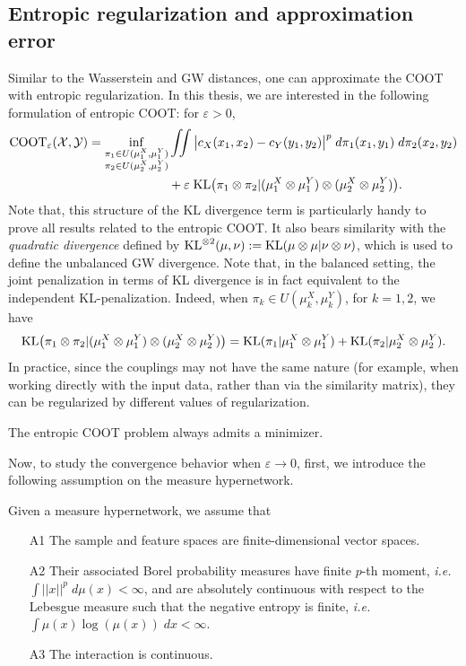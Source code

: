 \subsection{Entropic regularization and approximation error}
Similar to the Wasserstein and GW distances, one can approximate the COOT with entropic regularization.
In this thesis, we are interested in the following formulation of entropic COOT:
for $\varepsilon > 0$,
\begin{align}
  \text{COOT}_{\varepsilon} (\mathcal X, \mathcal Y) =
  \inf_{\substack{\pi_1 \in U(\mu^X_1, \mu^Y_1) \\
  \pi_2 \in U(\mu^X_2, \mu^Y_2)}} &\iint
  \big\vert c_X(x_1, x_2) - c_Y(y_1, y_2) \big\vert^p \; d\pi_1(x_1, y_1) \; d\pi_2(x_2, y_2) \\
  &+ \varepsilon \; \text{KL} \big( \pi_1 \otimes \pi_2 \vert (\mu^X_1 \otimes \mu^Y_1) \otimes (\mu^X_2 \otimes \mu^Y_2) \big).
\end{align}
Note that, this structure of the KL divergence term is particularly handy to prove all results related to
the entropic COOT. It also bears similarity with the \textit{quadratic divergence}
\citep{Sejourne20} defined by $\text{KL}^{\otimes 2}(\mu, \nu):= \text{KL}(\mu \otimes \mu | \nu \otimes \nu)$,
which is used to define the unbalanced GW divergence. Note that, in the balanced setting,
the joint penalization in terms of KL divergence is in fact equivalent to the
independent KL-penalization. Indeed, when $\pi_k \in U(\mu_k^X, \mu_k^Y)$, for $k=1,2$, we have
\begin{equation}
  \text{KL} \big( \pi_1 \otimes \pi_2 \vert (\mu^X_1 \otimes \mu^Y_1) \otimes (\mu^X_2 \otimes \mu^Y_2) \big)
  = \text{KL}(\pi_1 \vert \mu^X_1 \otimes \mu^Y_1) + \text{KL}(\pi_2 \vert \mu^X_2 \otimes \mu^Y_2).
\end{equation}
In practice, since the couplings may not have the same nature (for example,
when working directly with the input data, rather than via the similarity matrix),
they can be regularized by different values of regularization.
\begin{proposition}
The entropic COOT problem always admits a minimizer.
\end{proposition}
Now, to study the convergence behavior when $\varepsilon \to 0$, first,
we introduce the following assumption on the measure hypernetwork.
\begin{assumption}
  \label{assump:ent_coot}
  Given a measure hypernetwork, we assume that
  \begin{enumerate}
    \item[A1] The sample and feature spaces are finite-dimensional vector spaces.
    \item[A2] Their associated Borel probability measures have finite $p$-th moment,
    \textit{i.e.} $\int ||x||^p \; d\mu(x) < \infty$, and are absolutely continuous
    with respect to the Lebesgue measure such that the negative entropy is finite,
    \textit{i.e.} $\int \mu(x) \log(\mu(x)) \; dx < \infty$.
    \item[A3] The interaction is continuous.
  \end{enumerate}
\end{assumption}
